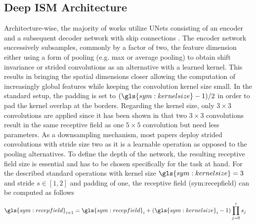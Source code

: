 \subsection{Deep ISM Architecture}
\label{subsec:architecture}
Architecture-wise, the majority of works utilize UNets \cite{ronneberger2015u} consisting of an encoder and a subsequent decoder network with skip connections \cite{prophet2019semantic,sless2019road,wirges2018evidential,weston2019probably,schulter2018learning,lu2019monocular,mani2020monolayout}. The encoder network successively subsamples, commonly by a factor of two, the feature dimension either using a form of pooling (e.g. max or average pooling) to obtain shift invariance or strided convolutions as an alternative with a learned kernel. This results in bringing the spatial dimensions closer allowing the computation of increasingly global features while keeping the convolution kernel size small. In the standard setup, the padding is set to $(\gls{sym:kernelsize}-1)/2$ in order to pad the kernel overlap at the borders. Regarding the kernel size, only $3 \times 3$ convolutions are applied since it has been shown in \cite{simonyan2014very} that two $3 \times 3$ convolutions result in the same receptive field as one $5 \times 5$ convolution but need less parameters. As a downsampling mechanism, most papers deploy strided convolutions with stride size two as it is a learnable operation as opposed to the pooling alternatives. To define the depth of the network, the resulting receptive field size is essential and has to be chosen specifically for the task at hand. For the described standard operations with kernel size $\gls{sym:kernelsize}=3$ and stride $s \in [1,2]$ and padding of one, the receptive field (\gls{sym:recepfield}) can be computed as follows
\begin{align}
	\label{eq:receptive_field}
	\gls{sym:recepfield}_{i+1} &= \gls{sym:recepfield}_i + (\gls{sym:kernelsize}_i-1)\prod_{j=0}^{i}s_j
\end{align}
